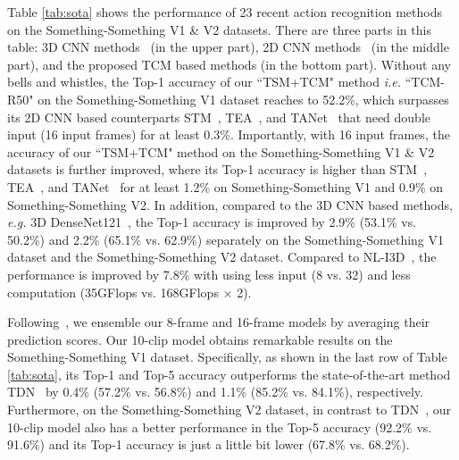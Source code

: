\documentclass[journal]{IEEEtran}
\begin{document}
Table \ref{tab:sota} shows the performance of 23 recent action recognition methods on the Something-Something V1 \& V2 datasets. There are three parts in this table: 3D CNN methods~\cite{zolfaghari2018eco,wang2018videos,xie2018rethinking,martinez2019action} (in the upper part), 2D CNN methods~\cite{wang2016temporal,zhou2018temporal,lee2018motion,liu2019learning,jiang2019stm,li2020tea,kwon2020motionsqueeze} (in the middle part), and the proposed TCM based methods (in the bottom part). Without any bells and whistles, the Top-1 accuracy of our ``TSM+TCM" method \textit{i.e.} ``TCM-R50" on the Something-Something V1 dataset reaches to 52.2\%, which surpasses its 2D CNN based counterparts STM~\cite{jiang2019stm}, TEA~\cite{li2020tea}, and TANet~\cite{liu2020tam} that need double input (16 input frames) for at least 0.3\%. Importantly, with 16 input frames, the accuracy of our ``TSM+TCM" method on the Something-Something V1 \& V2 datasets is further improved, where its Top-1 accuracy is higher than STM~\cite{jiang2019stm}, TEA~\cite{li2020tea}, and TANet~\cite{liu2020tam} for at least 1.2\% on Something-Something V1 and 0.9\% on Something-Something V2. In addition, compared to the 3D CNN based methods, \textit{e.g.} 3D DenseNet121~\cite{zhou2020spatiotemporal}, the Top-1 accuracy is improved by 2.9\% (53.1\% vs. 50.2\%) and 2.2\% (65.1\% vs. 62.9\%) separately on the Something-Something V1 dataset and the Something-Something V2 dataset. Compared to NL-I3D~\cite{wang2018videos}, the performance is improved by 7.8\% with using less input (8 vs. 32) and less computation (35GFlops vs. 168GFlops $\times$ 2).

Following~\cite{lin2019tsm,kwon2020motionsqueeze}, we ensemble our 8-frame and 16-frame models by averaging their prediction scores.
Our 10-clip model obtains remarkable results on the Something-Something V1 dataset. Specifically, as shown in the last row of Table \ref{tab:sota}, its Top-1 and Top-5 accuracy outperforms the state-of-the-art method TDN~\cite{wang2021tdn} by 0.4\% (57.2\% vs. 56.8\%) and 1.1\% (85.2\% vs. 84.1\%), respectively. Furthermore, on the Something-Something V2 dataset, in contrast to TDN~\cite{wang2021tdn}, our 10-clip model also has a better performance in the Top-5 accuracy (92.2\% vs. 91.6\%) and its Top-1 accuracy is just a little bit lower (67.8\% vs. 68.2\%).
\end{document}
